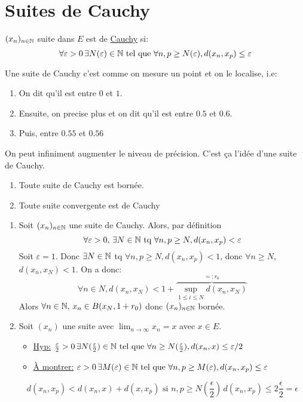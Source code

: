 \section{Suites de Cauchy}
\begin{definition}
    $(x_n)_{n \in \mathbb{N}}$ suite dans $E$ est de \underline{Cauchy} si:
     \[
    \forall \varepsilon > 0 \, \exists N(\varepsilon) \in \mathbb{N} \text{ tel que } \forall n, p \ge N(\varepsilon), d(x_n, x_p) \le \varepsilon
    \] 
\end{definition}
\begin{intuition}
   Une suite de Cauchy c'est comme on mesure un point et on le localise, i.e:
   \begin{enumerate}
       \item On dit qu'il est entre $0$ et  $1$.
       \item Ensuite, on precise plus et on dit qu'il est entre  $0.5$ et  $0.6$.
       \item Puis, entre  $0.55$ et  $0.56$
   \end{enumerate}
   On peut infiniment augmenter le niveau de précision. C'est ça l'idée d'une suite de Cauchy.
\end{intuition}
\begin{prop}
   \begin{enumerate}
       \item Toute suite de Cauchy est bornée.
        \item Toute suite convergente est de Cauchy
   \end{enumerate} 
\end{prop}
\begin{preuve}
   \begin{enumerate}
       \item Soit $(x_n)_{n \in \mathbb{N}}$ une suite de Cauchy. Alors, par définition
           \[
           \forall \varepsilon > 0, \, \exists N \in \mathbb{N} \text{ tq } \forall n, p \ge N, d(x_n, x_p) < \varepsilon
           \] 
           Soit $\varepsilon = 1$. Donc  $\exists N \in \mathbb{N}$ tq $\forall n, p \ge N, d(x_n, x_p) < 1$, donc $\forall n \ge N$, $d(x_n, x_N) < 1$. On a donc:
           \[
               \forall n \in  N, d(x_n, x_N) < 1 + \overbrace{\sup_{1 \le i \le N}d(x_n, x_N)}^{=: r_0}
           \] 
           Alors $\forall n \in \mathbb{N}, \, x_n \in B(x_N, 1 + r_0)$ donc $(x_n)_{n \in \mathbb{N}}$ bornée.
       \item Soit $(x_n)$ une suite avec  $\lim_{n \to \infty} x_n = x$ avec $x \in E$.
           \begin{itemize}
               \item 
                   \underline{Hyp:}  $\frac{\varepsilon}{2} > 0 \, \exists N(\frac{\varepsilon}{2}) \in \mathbb{N} \text{ tel que } \forall n \ge N(\frac{\varepsilon}{2}), d(x_n, x) \le \varepsilon/2$
                \item 
                    \underline{À montrer:} $\varepsilon > 0 \, \exists M(\varepsilon) \in \mathbb{N} \text{ tel que } \forall n, p \ge M(\varepsilon), d(x_n, x_p) \le \varepsilon$
           \end{itemize}
           \[
               d(x_n, x_p) < d(x_n, x) + d(x, x_p) \text{ si } n, p \ge  N(\frac{\epsilon}{2}) \, d(x_n, x_p) \le 2 \frac{\epsilon}{2} = \epsilon
           \] 
   \end{enumerate} 
\end{preuve}
